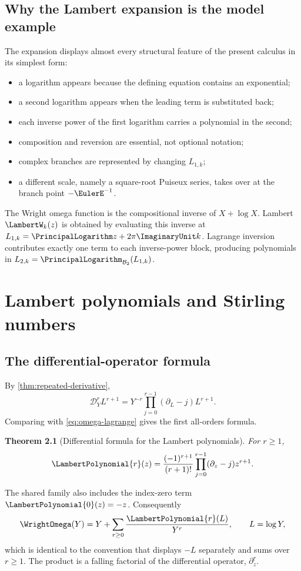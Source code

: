\documentclass[11pt,oneside]{book}
\newtheorem{theorem}{Theorem}[chapter]
\theoremstyle{definition}
\theoremstyle{remark}
\newcommand{\D}{\mathcal D}
\newcommand{\LogarithmOnBranch}[2]{%
  \PrincipalLogarithm_{#1}\!\left(#2\right)%
}
\begin{document}
\section{Why the Lambert expansion is the model example}
The expansion displays almost every structural feature of the present
calculus in its simplest form:
\begin{itemize}
\item a logarithm appears because the defining equation contains an
      exponential;
\item a second logarithm appears when the leading term is substituted back;
\item each inverse power of the first logarithm carries a polynomial in the
      second;
\item composition and reversion are essential, not optional notation;
\item complex branches are represented by changing $L_{1,k}$;
\item a different scale, namely a square-root Puiseux series, takes over at
      the branch point $-\EulerE^{-1}$.
\end{itemize}

\begin{summarybox}
The Wright omega function is the compositional inverse of $X+\log X$.
Lambert $\LambertW_k(z)$ is obtained by evaluating this inverse at
$L_{1,k}=\PrincipalLogarithm z+2\pi\ImaginaryUnit k$.  Lagrange inversion contributes exactly one term
to each inverse-power block, producing polynomials in
$L_{2,k}=\LogarithmOnBranch{\mathcal B_2}{L_{1,k}}$.
\end{summarybox}


\chapter{Lambert polynomials and Stirling numbers}
\label{ch:lambert-polynomials}

\section{The differential-operator formula}
By \cref{thm:repeated-derivative},
\[
 \D_Y^r L^{r+1}
 =Y^{-r}\prod_{j=0}^{r-1}(\partial_L-j)L^{r+1}.
\]
Comparing with \eqref{eq:omega-lagrange} gives the first all-orders formula.

\begin{theorem}[Differential formula for the Lambert polynomials]
\label{thm:P-differential}
For $r\ge1$,
\begin{equation}\label{eq:P-differential}
 \LambertPolynomial{r}(z)=\frac{(-1)^{r+1}}{(r+1)!}
 \prod_{j=0}^{r-1}(\partial_z-j)z^{r+1}.
\end{equation}
\end{theorem}
The shared family also includes the index-zero term
$\LambertPolynomial{0}(z)=-z$.  Consequently
\[
 \WrightOmega(Y)=Y+
 \sum_{r\ge0}\frac{\LambertPolynomial{r}(L)}{Y^r},
 \qquad L=\log Y,
\]
which is identical to the convention that displays $-L$ separately and sums
over $r\ge1$.
The product is a falling factorial of the differential operator,
$\partial_z^{\underline r}$.
\end{document}
